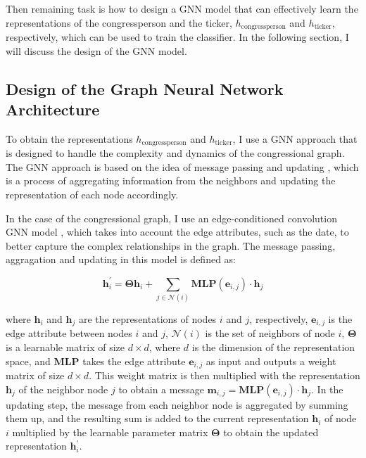 \documentclass[15pt,letterpaper]{article}
\begin{document}
Then remaining task is how to design a GNN model that can effectively learn the representations of the congressperson and the ticker, $h_{\text{congressperson}}$ and $h_{\text{ticker}}$, respectively, which can be used to train the classifier. In the following section, I will discuss the design of the GNN model.

\subsection{Design of the Graph Neural Network Architecture}

To obtain the representations $h_{\text{congressperson}}$ and $h_{\text{ticker}}$, I use a GNN approach that is designed to handle the complexity and dynamics of the congressional graph. The GNN approach is based on the idea of message passing and updating \citep{gnn1, gnn2}, which is a process of aggregating information from the neighbors and updating the representation of each node accordingly.

In the case of the congressional graph, I use an edge-conditioned convolution GNN model \citep{nnconv1, nnconv2}, which takes into account the edge attributes, such as the date, to better capture the complex relationships in the graph. The message passing, aggragation and updating in this model is defined as:

$$
\mathbf{h}_i^{\prime}=\boldsymbol{\Theta} \mathbf{h}_i+\sum_{j \in \mathcal{N}(i)}  \mathbf{MLP}\left(\mathbf{e}_{i, j}\right) \cdot \mathbf{h}_j
$$

where $\mathbf{h}_i$ and $\mathbf{h}_j$ are the representations of nodes $i$ and $j$, respectively, $\mathbf{e}_{i,j}$ is the edge attribute between nodes $i$ and $j$, $\mathcal{N}(i)$ is the set of neighbors of node $i$, $\boldsymbol{\Theta}$ is a learnable matrix of size $d \times d$, where $d$ is the dimension of the representation space, and $\mathbf{MLP}$ takes the edge attribute $\mathbf{e}_{i,j}$ as input and outputs a weight matrix of size $d \times d$. 
This weight matrix is then multiplied with the representation $\mathbf{h}_j$ of the neighbor node $j$ to obtain a message $\mathbf{m}_{i,j}= \mathbf{M L P}\left(\mathbf{e}_{i, j}\right) \cdot \mathbf{h}_j$. In the updating step, the message from each neighbor node is aggregated by summing them up, and the resulting sum is added to the current representation $\mathbf{h}_i$ of node $i$ multiplied by the learnable parameter matrix $\boldsymbol{\Theta}$ to obtain the updated representation $\mathbf{h}_i^{\prime}$.
\end{document}
